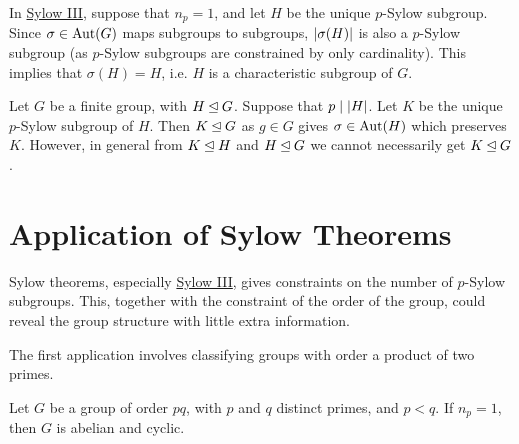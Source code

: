 \begin{remark}
    In \hyperref[thm: Sylow III]{Sylow III}, suppose that $n_p = 1$, and let $H$ be the unique $p$-Sylow subgroup. Since $\sigma \in \mathrm{Aut}(G)$ maps subgroups to subgroups, $\left|\sigma(H)\right|$ is also a $p$-Sylow subgroup (as $p$-Sylow subgroups are constrained by only cardinality). This implies that $\sigma(H) = H$, i.e. $H$ is a characteristic subgroup of $G$.
\end{remark}

\begin{example}
    Let $G$ be a finite group, with $H \unlhd G$. Suppose that $p \mid \left|H\right|$. Let $K$ be the unique $p$-Sylow subgroup of $H$. Then $K \unlhd G$ as $g \in G$ gives $\sigma \in \mathrm{Aut}(H)$ which preserves $K$. However, in general from $K \unlhd H$ and $H \unlhd G$ we cannot necessarily get $K \unlhd G$.
\end{example}

\section{Application of Sylow Theorems}

\textstart
Sylow theorems, especially \hyperref[thm: Sylow III]{Sylow III}, gives constraints on the number of $p$-Sylow subgroups. This, together with the constraint of the order of the group, could reveal the group structure with little extra information.

The first application involves classifying groups with order a product of two primes.

\begin{proposition}
    Let $G$ be a group of order $pq$, with $p$ and $q$ distinct primes, and $p < q$. If $n_p = 1$, then $G$ is abelian and cyclic.
\end{proposition}

